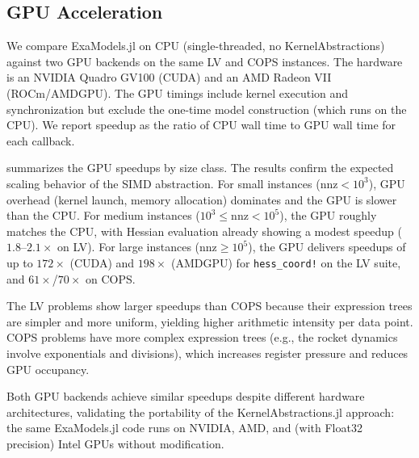 \documentclass[11pt]{article}
\begin{document}
\subsection{GPU Acceleration}
\label{sec:numerics:gpu}

We compare ExaModels.jl on CPU (single-threaded, no KernelAbstractions) against two GPU backends on the same LV and COPS instances. The hardware is an NVIDIA Quadro GV100 (CUDA) and an AMD Radeon VII (ROCm/AMDGPU). The GPU timings include kernel execution and synchronization but exclude the one-time model construction (which runs on the CPU). We report speedup as the ratio of CPU wall time to GPU wall time for each callback.

 summarizes the GPU speedups by size class. The results confirm the expected scaling behavior of the SIMD abstraction. For small instances ($\text{nnz} < 10^3$), GPU overhead (kernel launch, memory allocation) dominates and the GPU is slower than the CPU. For medium instances ($10^3 \leq \text{nnz} < 10^5$), the GPU roughly matches the CPU, with Hessian evaluation already showing a modest speedup ($1.8$--$2.1\times$ on LV). For large instances ($\text{nnz} \geq 10^5$), the GPU delivers speedups of up to $172\times$ (CUDA) and $198\times$ (AMDGPU) for \texttt{hess\_coord!} on the LV suite, and $61\times$/$70\times$ on COPS.

The LV problems show larger speedups than COPS because their expression trees are simpler and more uniform, yielding higher arithmetic intensity per data point. COPS problems have more complex expression trees (e.g., the rocket dynamics involve exponentials and divisions), which increases register pressure and reduces GPU occupancy.

Both GPU backends achieve similar speedups despite different hardware architectures, validating the portability of the KernelAbstractions.jl approach: the same ExaModels.jl code runs on NVIDIA, AMD, and (with Float32 precision) Intel GPUs without modification.
\end{document}
